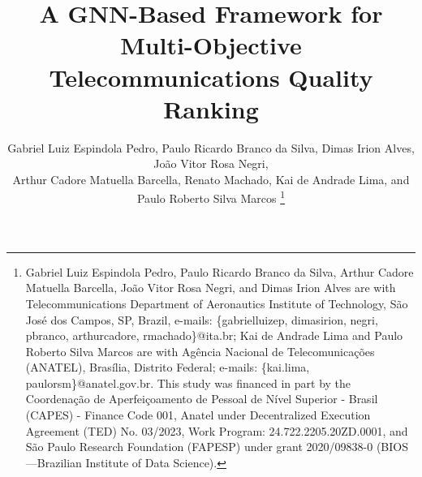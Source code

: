 \documentclass[english]{sbrt}
\begin{document}


\renewcommand{\algorithmicrequire}{\textbf{Input:}}

\newcommand{\iqsrev}{\mathrm{QoS}_\mathrm{rev}}
\newcommand{\iqsleg}{\mathrm{QoS}_\mathrm{leg}}

\newcommand{\Xraw}{\mathbf{X}}
\newcommand{\xraw}{\mathbf{x}}

\newcommand{\Xpareto}{\mathbf{X}^{\mathcal{P}}}
\newcommand{\xpareto}{\mathbf{x}^{\mathcal{P}}}

\newcommand{\Xmodel}{\tilde{\mathbf{X}}}
\newcommand{\xmodel}{\tilde{\mathbf{x}}}

\newcommand{\Xlog}{\mathbf{X}^\mathrm{log}}
\newcommand{\xlog}{\mathbf{x}^\mathrm{log}}

\title{A GNN-Based Framework for Multi-Objective Telecommunications Quality Ranking}

\author{Gabriel Luiz Espindola Pedro, Paulo Ricardo Branco da Silva, Dimas Irion
  Alves, João Vitor Rosa  Negri, \\ Arthur Cadore Matuella Barcella, Renato
  Machado, Kai de Andrade Lima, and Paulo Roberto Silva Marcos \thanks{Gabriel
    Luiz Espindola Pedro, Paulo Ricardo Branco da Silva, Arthur Cadore Matuella
    Barcella, João Vitor Rosa Negri, and Dimas Irion Alves are with
    Telecommunications Department of Aeronautics Institute of Technology, São
    José dos Campos, SP, Brazil, e-mails: \{gabrielluizep, dimasirion, negri,
    pbranco, arthurcadore, rmachado\}@ita.br; Kai de Andrade Lima and Paulo
    Roberto Silva Marcos are with Agência Nacional de Telecomunicações (ANATEL),
    Brasília, Distrito Federal; e-mails: \{kai.lima, paulorsm\}@anatel.gov.br.
    This study was financed in part by the Coordenação de Aperfeiçoamento de
    Pessoal de Nível Superior - Brasil (CAPES) - Finance Code  001, Anatel under
    Decentralized Execution Agreement (TED) No. 03/2023, Work Program:
    24.722.2205.20ZD.0001, and São Paulo Research Foundation (FAPESP) under
  grant 2020/09838-0 (BIOS---Brazilian Institute of Data Science).}%
}

\maketitle

\end{document}
